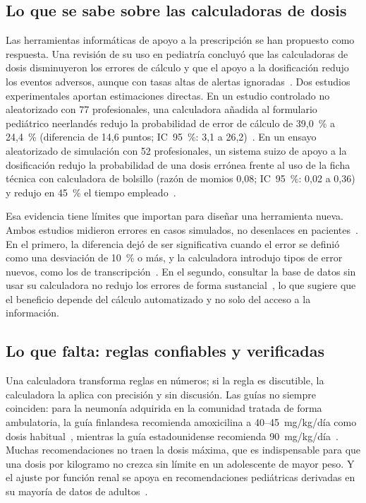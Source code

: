 \documentclass[11pt,a4paper]{article}
\begin{document}
\subsection{Lo que se sabe sobre las calculadoras de dosis}

Las herramientas informáticas de apoyo a la prescripción se han propuesto como respuesta. Una revisión de su uso en pediatría concluyó que las calculadoras de dosis disminuyeron los errores de cálculo y que el apoyo a la dosificación redujo los eventos adversos, aunque con tasas altas de alertas ignoradas~\citep{stultz2012}. Dos estudios experimentales aportan estimaciones directas. En un estudio controlado no aleatorizado con 77 profesionales, una calculadora añadida al formulario pediátrico neerlandés redujo la probabilidad de error de cálculo de 39,0~\% a 24,4~\% (diferencia de 14,6 puntos; IC~95~\%: 3,1 a 26,2)~\citep{vanderzanden2020}. En un ensayo aleatorizado de simulación con 52 profesionales, un sistema suizo de apoyo a la dosificación redujo la probabilidad de una dosis errónea frente al uso de la ficha técnica con calculadora de bolsillo (razón de momios 0,08; IC~95~\%: 0,02 a 0,36) y redujo en 45~\% el tiempo empleado~\citep{higi2023}.

Esa evidencia tiene límites que importan para diseñar una herramienta nueva. Ambos estudios midieron errores en casos simulados, no desenlaces en pacientes~\citep{vanderzanden2020,higi2023}. En el primero, la diferencia dejó de ser significativa cuando el error se definió como una desviación de 10~\% o más, y la calculadora introdujo tipos de error nuevos, como los de transcripción~\citep{vanderzanden2020}. En el segundo, consultar la base de datos sin usar su calculadora no redujo los errores de forma sustancial~\citep{higi2023}, lo que sugiere que el beneficio depende del cálculo automatizado y no solo del acceso a la información.

\subsection{Lo que falta: reglas confiables y verificadas}

Una calculadora transforma reglas en números; si la regla es discutible, la calculadora la aplica con precisión y sin discusión. Las guías no siempre coinciden: para la neumonía adquirida en la comunidad tratada de forma ambulatoria, la guía finlandesa recomienda amoxicilina a 40--45~mg/kg/día como dosis habitual~\citep{backman2025}, mientras la guía estadounidense recomienda 90~mg/kg/día~\citep{bradley2011}. Muchas recomendaciones no traen la dosis máxima, que es indispensable para que una dosis por kilogramo no crezca sin límite en un adolescente de mayor peso. Y el ajuste por función renal se apoya en recomendaciones pediátricas derivadas en su mayoría de datos de adultos~\citep{schijvens2020,minotti2022}.
\end{document}
